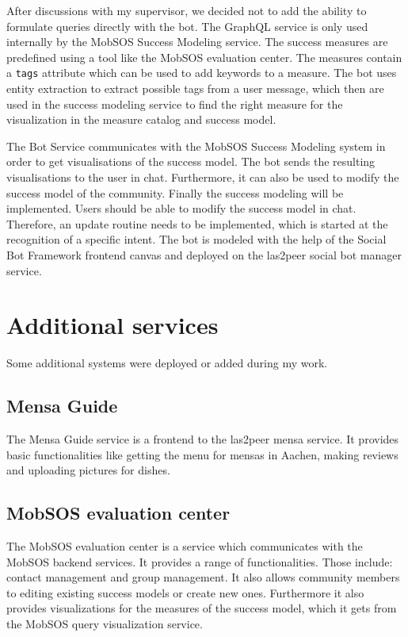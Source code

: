 After discussions with my supervisor, we decided not to add the ability to formulate queries directly with the bot. The GraphQL service is only used internally by the MobSOS Success Modeling service. The success measures are predefined using a tool like the MobSOS evaluation center. The measures contain a \texttt{tags} attribute which can be used to add keywords to a measure. The bot uses entity extraction to extract possible tags from a user message, which then are used in the success modeling service to find the right measure for the visualization in the measure catalog and success model.

The Bot Service communicates with the MobSOS Success Modeling system in order to get visualisations of the success model. The bot sends the resulting visualisations to the user in chat.
Furthermore, it can also be used to modify the success model of the community. 
Finally the success modeling will be implemented. Users should be able
to modify the success model in chat. Therefore, an update routine needs to be implemented, which is started at the recognition of a specific intent.
The bot is modeled with the help of the Social Bot Framework frontend canvas and deployed on the las2peer social bot manager service.


\section{Additional services}\label{sec:additional}
Some additional systems were deployed or added during my work.

\subsection{Mensa Guide}
The Mensa Guide service is a frontend to the las2peer mensa service. It provides basic functionalities like getting the menu for mensas in Aachen, making reviews and uploading pictures for dishes.  

\subsection{MobSOS evaluation center}
The MobSOS evaluation center is a service which communicates with the MobSOS backend services. It provides a range of functionalities. Those include: contact management and group management. 
It also allows community members to editing existing success models or create new ones.
Furthermore it also provides visualizations for the measures of the success model, which it gets from the MobSOS query visualization service.

